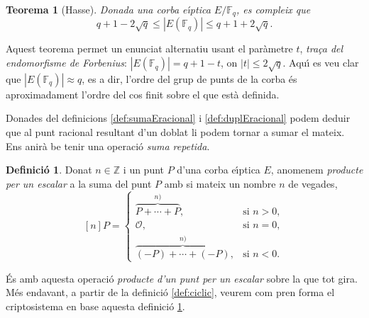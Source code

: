 \documentclass[12pt,twoside,catalan,a4paper]{book}%
\newtheorem{thm}{Teorema}%
\numberwithin{figure}{section}		%
\theoremstyle{definition}   			%
\newtheorem{defi}{Definici\'o}[chapter]%
\def\ce{corba e\lgem{}\'{\i}ptica}%
\def\cf{cos finit}%
\newcommand{\Z}{\ensuremath{\mathbb{Z}}}%
\newcommand{\Fq}{\ensuremath{\mathbb{F}_q}}%
\theoremstyle{saltolinea}   			%
\begin{document}
\begin{thm}[Hasse]\label{teo:hasse} Donada una \ce{} $E/\Fq$, es compleix que
\begin{equation}\label{eq:hasse} q+1-2\sqrt{q}\le \left|E(\Fq)\right|\le q+1+2\sqrt{q}.\end{equation}
\end{thm}
Aquest teorema permet un enunciat alternatiu usant el par\`ametre $t$, \emph{tra\c{c}a del endomorfisme de Forbenius}: $\left|E(\Fq)\right|=q+1-t$, on $\left|t\right|\le 2\sqrt{q}$. Aqu\'{\i} es veu clar que $\left|E(\Fq)\right|\approx q$, es a dir, l'ordre del grup de punts de la corba \'es aproximadament l'ordre del \cf{} sobre el que est\`a definida.

Donades del definicions \ref{def:sumaEracional} i \ref{def:duplEracional} podem deduir que al punt racional resultant d'un doblat li podem tornar a sumar el mateix. Ens anir\`a be tenir una operaci\'o \emph{suma repetida}.

\begin{defi}\label{def:multEracional} Donat $n\in\Z$ i un punt $P$ d'una \ce{} $E$, anomenem \emph{producte per un escalar} a la suma del punt $P$ amb si mateix un nombre $n$ de vegades,
$$[n]P=\begin{cases}\overbrace{P+\cdots+P}^{n)}, &\text{si }n>0,\\ \mathcal{O}, &\text{si }n=0,\\ \overbrace{(-P)+\cdots+(-P)}^{n)}, &\text{si }n<0.\end{cases}$$
\end{defi}

\'Es amb aquesta operaci\'o \emph{producte d'un punt per un escalar} sobre la que tot gira. M\'es endavant, a partir de la definici\'o \ref{def:ciclic}, veurem com pren forma el criptosistema en base aquesta definici\'o \ref{def:multEracional}.
\end{document}
